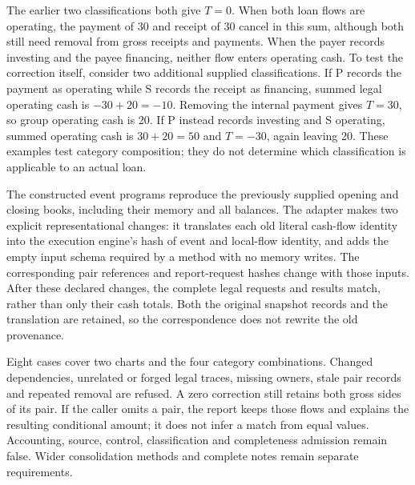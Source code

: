 The earlier two classifications both give $T=0$. When both loan flows are
operating, the payment of 30 and receipt of 30 cancel in this sum, although both
still need removal from gross receipts and payments. When the payer records
investing and the payee financing, neither flow enters operating cash. To test
the correction itself, consider two additional supplied classifications. If P
records the payment as operating while S records the receipt as financing,
summed legal operating cash is $-30+20=-10$. Removing the internal payment
gives $T=30$, so group operating cash is 20. If P instead records investing
and S operating, summed operating cash is $30+20=50$ and $T=-30$, again leaving
20. These examples test category composition; they do not determine which
classification is applicable to an actual loan.

The constructed event programs reproduce the previously supplied opening and
closing books, including their memory and all balances. The adapter makes two
explicit representational changes: it translates each old literal cash-flow
identity into the execution engine's hash of event and local-flow identity,
and adds the empty input schema required by a method with no memory writes.
The corresponding pair references and report-request hashes change with those
inputs. After these declared changes, the complete legal requests and results
match, rather than only their cash totals. Both the original snapshot records
and the translation are retained, so the correspondence does not rewrite the
old provenance.

Eight cases cover two charts and the four category combinations. Changed
dependencies, unrelated or forged legal traces, missing owners, stale pair
records and repeated removal are refused. A zero correction still retains both
gross sides of its pair. If the caller omits a pair, the report keeps those
flows and explains the resulting conditional amount; it does not infer a match
from equal values. Accounting, source, control, classification and completeness
admission remain false. Wider consolidation methods and complete notes remain
separate requirements.



